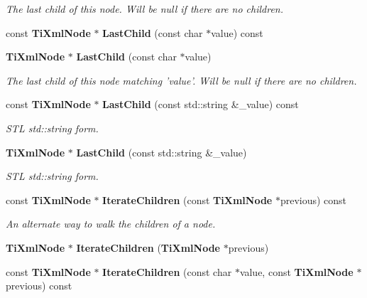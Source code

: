 \begin{CompactItemize}
\begin{CompactList}\small\item\em The last child of this node. Will be null if there are no children. \item\end{CompactList}\item 
const {\bf Ti\-Xml\-Node} $\ast$ {\bf Last\-Child} (const char $\ast$value) const\label{classTiXmlNode_TiXmlUnknowna22}

\item 
{\bf Ti\-Xml\-Node} $\ast$ {\bf Last\-Child} (const char $\ast$value)\label{classTiXmlNode_TiXmlUnknowna23}

\begin{CompactList}\small\item\em The last child of this node matching 'value'. Will be null if there are no children. \item\end{CompactList}\item 
const {\bf Ti\-Xml\-Node} $\ast$ {\bf Last\-Child} (const std::string \&\_\-value) const\label{classTiXmlNode_TiXmlUnknowna24}

\begin{CompactList}\small\item\em STL std::string form. \item\end{CompactList}\item 
{\bf Ti\-Xml\-Node} $\ast$ {\bf Last\-Child} (const std::string \&\_\-value)\label{classTiXmlNode_TiXmlUnknowna25}

\begin{CompactList}\small\item\em STL std::string form. \item\end{CompactList}\item 
const {\bf Ti\-Xml\-Node} $\ast$ {\bf Iterate\-Children} (const {\bf Ti\-Xml\-Node} $\ast$previous) const
\begin{CompactList}\small\item\em An alternate way to walk the children of a node. \item\end{CompactList}\item 
{\bf Ti\-Xml\-Node} $\ast$ {\bf Iterate\-Children} ({\bf Ti\-Xml\-Node} $\ast$previous)\label{classTiXmlNode_TiXmlUnknowna27}

\item 
const {\bf Ti\-Xml\-Node} $\ast$ {\bf Iterate\-Children} (const char $\ast$value, const {\bf Ti\-Xml\-Node} $\ast$previous) const\label{classTiXmlNode_TiXmlUnknowna28}


\end{CompactItemize}
